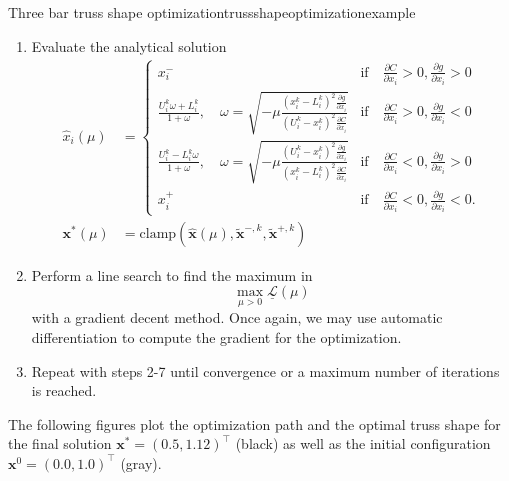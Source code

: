 \begin{example}{Three bar truss shape optimization}{trussshapeoptimizationexample}
\begin{enumerate}
        \item Evaluate the analytical solution
            \begin{align}
                \hat{x}_i(\mu) &= 
                \begin{cases}
                    x^-_i 
                        &\textrm{if} \quad \frac{\partial C}{\partial x_i} > 0, \frac{\partial g}{\partial x_i} > 0 \\
                    \frac{U_i^k\omega + L_i^k}{1+\omega}, \quad \omega = \sqrt{-\mu\frac{(x_i^k-L_i^k)^2\frac{\partial g}{\partial x_i}}{(U_i^k-x_i^k)^2\frac{\partial C}{\partial x_i}}}
                        &\textrm{if} \quad \frac{\partial C}{\partial x_i}  > 0, \frac{\partial g}{\partial x_i} <0\\
                    \frac{U_i^k-L_i^k\omega}{1+\omega}, \quad \omega = \sqrt{-\mu\frac{(U_i^k-x_i^k)^2\frac{\partial g}{\partial x_i}}{(x_i^k-L_i^k)^2\frac{\partial C}{\partial x_i}}} 
                        &\textrm{if} \quad \frac{\partial C}{\partial x_i} < 0, \frac{\partial g}{\partial x_i}  > 0\\
                    x^+_i 
                        &\textrm{if} \quad \frac{\partial C}{\partial x_i}< 0, \frac{\partial g}{\partial x_i} < 0.
                \end{cases} \\
                \mathbf{x}^* (\mu) &= \textrm{clamp}\left(\hat{\mathbf{x}}(\mu), \tilde{\mathbf{x}}^{-,k}, \tilde{\mathbf{x}}^{+,k}\right)
            \end{align}
        \item Perform a line search to find the maximum in 
            \begin{equation}
                \max_{\mu>0} \underline{\mathcal{L}}(\mu)
            \end{equation}
            with a gradient decent method. Once again, we may use automatic differentiation to compute the gradient for the optimization.
        \item Repeat with steps 2-7 until convergence or a maximum number of iterations is reached.
    \end{enumerate}
    
    The following figures plot the optimization path and the optimal truss shape for the final solution $\mathbf{x}^* = (0.5, 1.12)^\top$ (black) as well as the initial configuration $\mathbf{x}^0 = (0.0, 1.0)^\top$ (gray).

    \begin{minipage}{.5\textwidth}
        \centering
        
    \end{minipage}%
    \begin{minipage}{.5\textwidth}
        \centering
        
    \end{minipage}
       
\end{example}


 





